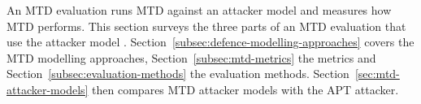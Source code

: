 \documentclass{cshonours}
\begin{document}
An MTD evaluation runs MTD against an attacker model and measures how MTD
performs. This section surveys the three parts of an MTD evaluation that
use the attacker model \citep{cho2020}.
Section~\ref{subsec:defence-modelling-approaches} covers the MTD modelling
approaches, Section~\ref{subsec:mtd-metrics} the metrics and
Section~\ref{subsec:evaluation-methods} the evaluation methods.
Section~\ref{sec:mtd-attacker-models} then compares MTD attacker models with
the APT attacker.

\end{document}
